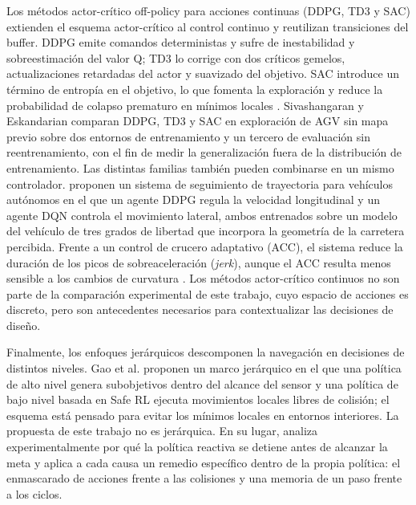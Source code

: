 Los métodos actor-crítico off-policy para acciones continuas
(DDPG, TD3 y SAC) extienden el esquema actor-crítico al control continuo y
reutilizan transiciones del buffer. DDPG emite comandos deterministas y
sufre de inestabilidad y sobreestimación del valor Q; TD3 lo corrige con
dos críticos gemelos, actualizaciones retardadas del actor y suavizado del
objetivo. SAC introduce un término de entropía en el objetivo, lo que
fomenta la exploración y reduce la probabilidad de colapso prematuro en
mínimos locales \citep{sivashangaran2023deep,xue2022using}. Sivashangaran
y Eskandarian \citep{sivashangaran2023deep} comparan DDPG, TD3 y SAC en
exploración de AGV sin mapa previo sobre dos entornos de entrenamiento y
un tercero de evaluación sin reentrenamiento, con el fin de medir la
generalización fuera de la distribución de entrenamiento. Las distintas
familias también pueden combinarse en un mismo controlador.
\citet{barreno2023comparison,barreno2025novel} proponen un sistema de
seguimiento de trayectoria para vehículos autónomos en el que un agente
DDPG regula la velocidad longitudinal y un agente DQN controla el
movimiento lateral, ambos entrenados sobre un modelo del vehículo de tres
grados de libertad que incorpora la geometría de la carretera percibida.
Frente a un control de crucero adaptativo (ACC), el sistema reduce la
duración de los picos de sobreaceleración (\textit{jerk}), aunque el ACC
resulta menos sensible a los cambios de curvatura
\citep{barreno2023comparison}. Los métodos actor-crítico continuos no
son parte de la comparación experimental de este trabajo, cuyo espacio de
acciones es discreto, pero son antecedentes necesarios para contextualizar
las decisiones de diseño.

Finalmente, los enfoques jerárquicos descomponen la navegación en
decisiones de distintos niveles. Gao et al. \citep{gao2025hierarchical}
proponen un marco jerárquico en el que una política de alto nivel genera
subobjetivos dentro del alcance del sensor y una política de bajo nivel
basada en Safe RL ejecuta movimientos locales libres de colisión; el
esquema está pensado para evitar los mínimos locales en entornos interiores.
La propuesta de este trabajo no es jerárquica. En su lugar, analiza
experimentalmente por qué la política reactiva se detiene antes de
alcanzar la meta y aplica a cada causa un remedio específico dentro de la
propia política: el enmascarado de acciones frente a las colisiones y una
memoria de un paso frente a los ciclos.

